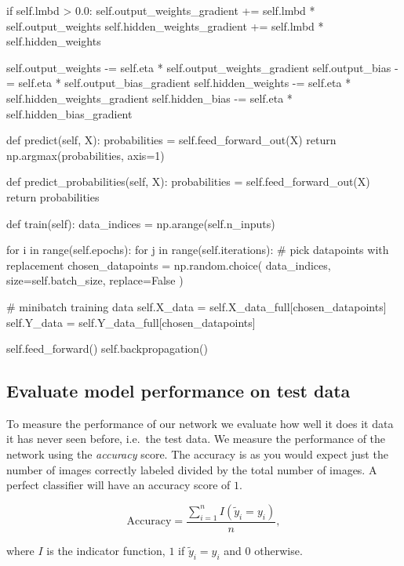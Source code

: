 \documentclass[%
oneside,                 %
final,                   %
10pt]{article}
\begin{document}
        if self.lmbd > 0.0:
            self.output_weights_gradient += self.lmbd * self.output_weights
            self.hidden_weights_gradient += self.lmbd * self.hidden_weights

        self.output_weights -= self.eta * self.output_weights_gradient
        self.output_bias -= self.eta * self.output_bias_gradient
        self.hidden_weights -= self.eta * self.hidden_weights_gradient
        self.hidden_bias -= self.eta * self.hidden_bias_gradient

    def predict(self, X):
        probabilities = self.feed_forward_out(X)
        return np.argmax(probabilities, axis=1)

    def predict_probabilities(self, X):
        probabilities = self.feed_forward_out(X)
        return probabilities

    def train(self):
        data_indices = np.arange(self.n_inputs)

        for i in range(self.epochs):
            for j in range(self.iterations):
                # pick datapoints with replacement
                chosen_datapoints = np.random.choice(
                    data_indices, size=self.batch_size, replace=False
                )

                # minibatch training data
                self.X_data = self.X_data_full[chosen_datapoints]
                self.Y_data = self.Y_data_full[chosen_datapoints]

                self.feed_forward()
                self.backpropagation()

\epycod


\subsection{Evaluate model performance on test data}

To measure the performance of our network we evaluate how well it does it data it has never seen before, i.e.~the test data.  
We measure the performance of the network using the \emph{accuracy} score.  
The accuracy is as you would expect just the number of images correctly labeled divided by the total number of images. A perfect classifier will have an accuracy score of $1$.  

$$ \text{Accuracy} = \frac{\sum_{i=1}^n I(\tilde{y}_i = y_i)}{n} ,$$  

where $I$ is the indicator function, $1$ if $\tilde{y}_i = y_i$ and $0$ otherwise.
\end{document}

